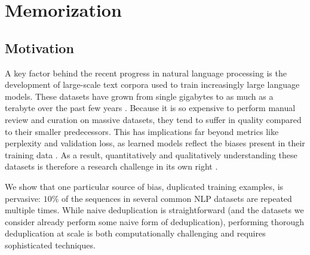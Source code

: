 \newcommand{\Approx}[0]{\textsc{NearDup}}
\newcommand{\Exact}[0]{\textsc{ExactSubstr}}
\newcommand{\Original}[0]{\textsc{Original}}
\newcommand{\pl}[1]{\hl{#1}}


\chapter{Memorization}
\label{chap:memorization}



\section{Motivation}



A key factor behind the recent progress in natural language processing is the development of large-scale text corpora used to train increasingly large language models.
These datasets have grown from single gigabytes to as much as a terabyte over the past few years \citep{chelba2013one,xue2020mt5,graff2003english,brown2020language}.
%
Because it is so expensive to perform manual review and curation on massive datasets, they tend to suffer in quality compared to their smaller predecessors.
This has implications far beyond metrics like perplexity and validation loss, as learned models reflect the biases present in their training data \cite{bender2021stochastic,wallace2019universal,sheng2020towards}.
As a result, quantitatively and qualitatively understanding these datasets is therefore a research challenge in its own right \cite{dodge2021documenting}.


We show that one particular source of bias,
duplicated training examples, is pervasive:
$10\%$ of the sequences in several common NLP datasets are repeated multiple times.
While naive deduplication is straightforward
(and the datasets we consider already perform some naive form
of deduplication), performing thorough deduplication at scale is both computationally challenging and requires sophisticated techniques.

